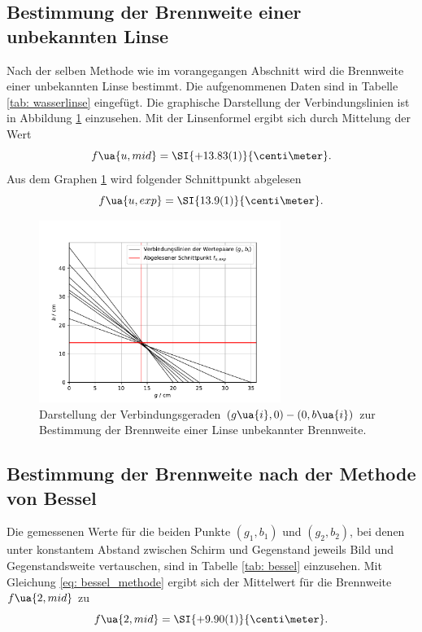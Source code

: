 \subsection{Bestimmung der Brennweite einer unbekannten Linse}
Nach der selben Methode wie im vorangegangen Abschnitt wird die Brennweite einer unbekannten Linse bestimmt.
Die aufgenommenen Daten sind in Tabelle \ref{tab: wasserlinse} eingefügt. Die graphische Darstellung der Verbindungslinien ist %
in Abbildung \ref{fig: wasserlinse} einzusehen. Mit der Linsenformel ergibt sich durch Mittelung der Wert
\begin{equation}
  f\ua{u, mid} = \SI{+13.83(1)}{\centi\meter}. %
\end{equation}
Aus dem Graphen \ref{fig: wasserlinse} wird folgender Schnittpunkt abgelesen
\begin{equation}
  f\ua{u, exp} = \SI{13.9(1)}{\centi\meter}.
\end{equation}

\begin{figure}
  \centering
  \includegraphics[width = 0.7\textwidth]{../Messdaten/plots/wasserlinse.pdf}
  \caption{Darstellung der Verbindungsgeraden $(g\ua{i}, 0) - (0, b\ua{i})$ zur Bestimmung der Brennweite einer
  Linse unbekannter Brennweite.}
  \label{fig: wasserlinse}
\end{figure}

\subsection{Bestimmung der Brennweite nach der Methode von Bessel}
Die gemessenen Werte für die beiden Punkte $(g_1, b_1)$ und $(g_2, b_2)$, bei denen unter konstantem Abstand
zwischen Schirm und Gegenstand jeweils Bild und Gegenstandsweite
vertauschen, sind in Tabelle \ref{tab: bessel} einzusehen. Mit Gleichung \eqref{eq: bessel_methode} ergibt sich der Mittelwert für
die Brennweite $f\ua{2, mid}$ zu
\begin{equation}
  f\ua{2, mid} = \SI{+9.90(1)}{\centi\meter}. %
  \label{eq: f_bessel}
\end{equation}

